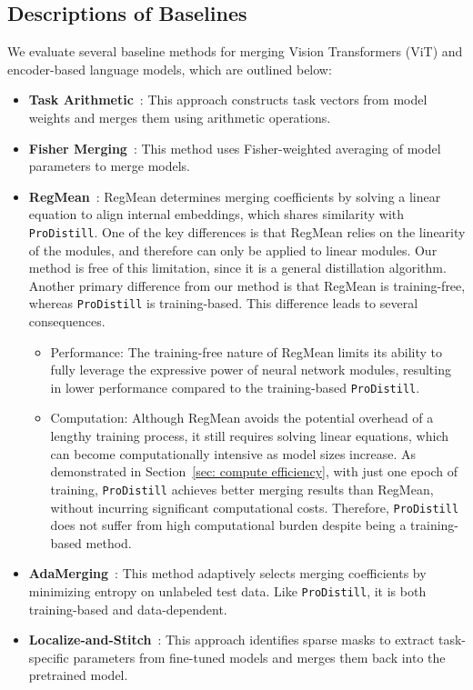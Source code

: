 \subsection{Descriptions of Baselines}
\label{apx:baselines}

We evaluate several baseline methods for merging Vision Transformers (ViT) and encoder-based language models, which are outlined below:
\begin{itemize}
    \item \textbf{Task Arithmetic}~\citep{ilharco2022editing}: This approach constructs task vectors from model weights and merges them using arithmetic operations.

    \item \textbf{Fisher Merging}~\citep{matena2022merging}: This method uses Fisher-weighted averaging of model parameters to merge models.

    \item \textbf{RegMean}~\citep{jin2022dataless}: RegMean determines merging coefficients by solving a linear equation to align internal embeddings, which shares similarity with \texttt{ProDistill}. One of the key differences is that RegMean relies on the linearity of the modules, and therefore can only be applied to linear modules. Our method is free of this limitation, since it is a general distillation algorithm. Another primary difference from our method is that RegMean is training-free, whereas \texttt{ProDistill} is training-based. This difference leads to several consequences. 
    \begin{itemize}
        \item Performance: The training-free nature of RegMean limits its ability to fully leverage the expressive power of neural network modules, resulting in lower performance compared to the training-based \texttt{ProDistill}. 
        \item Computation: Although RegMean avoids the potential overhead of a lengthy training process, it still requires solving linear equations, which can become computationally intensive as model sizes increase. As demonstrated in Section~\ref{sec: compute efficiency}, with just one epoch of training, \texttt{ProDistill} achieves better merging results than RegMean, without incurring significant computational costs. Therefore, \texttt{ProDistill} does not suffer from high computational burden despite being a training-based method.

    \end{itemize}
    \item \textbf{AdaMerging}~\citep{yang2023adamerging}: This method adaptively selects merging coefficients by minimizing entropy on unlabeled test data. Like \texttt{ProDistill}, it is both training-based and data-dependent.

    \item \textbf{Localize-and-Stitch}~\citep{he2024localize}: This approach identifies sparse masks to extract task-specific parameters from fine-tuned models and merges them back into the pretrained model.
\end{itemize}

